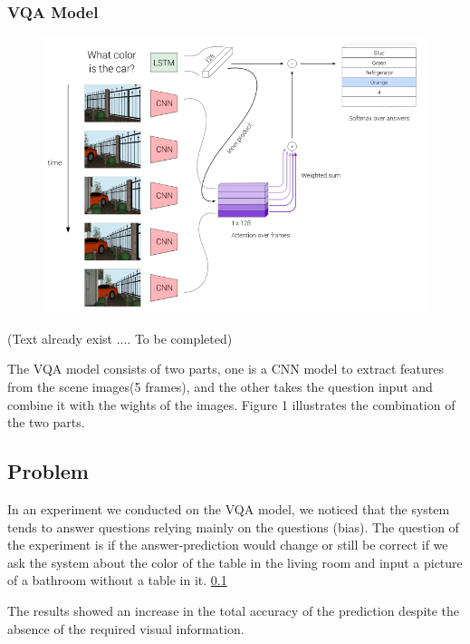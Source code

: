 \subsubsection{VQA Model}

\begin{figure}[H]
\includegraphics[scale=0.35]{latex/images/VQA.png}
\caption{}
\label{fig:VQ}
\end{figure}

(Text already exist .... To be completed)

The VQA model consists of two parts, one is a CNN model to extract features from the scene images(5 frames), and the other takes the question input and combine it with the wights of the images. Figure 1 illustrates the combination of the two parts. 





\subsection{Problem}



In an experiment we conducted on the VQA model, we noticed that the system tends to answer questions relying mainly on the questions (bias). The question of the experiment is if the answer-prediction would change or still be correct if we ask the system about the color of the table in the living room and input a picture of a bathroom without a table in it. \ref{}

The results showed an increase in the total accuracy of the prediction despite the absence of the required visual information.
 
